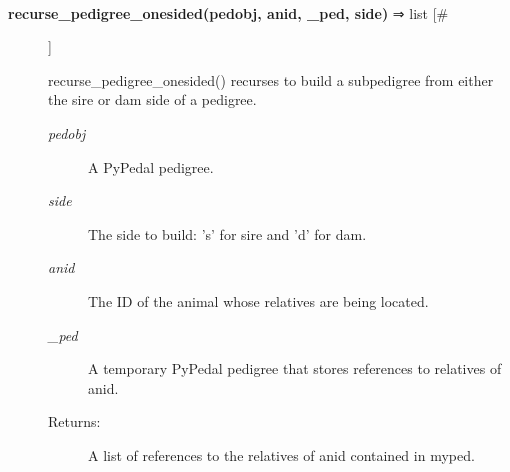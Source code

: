 \begin{description}
\begin{description}
\end{description}
\\ 

\item[\textbf{recurse\_pedigree\_onesided(pedobj, anid, \_ped, side)}
 ⇒ list [\#]]

 recurse\_pedigree\_onesided() recurses to build a subpedigree from either the sire or dam side of a pedigree.
\begin{description}
\item[\emph{pedobj}
] A PyPedal pedigree.
\item[\emph{side}
] The side to build: 's' for sire and 'd' for dam.
\item[\emph{anid}
] The ID of the animal whose relatives are being located.
\item[\emph{\_ped}
] A temporary PyPedal pedigree that stores references to relatives of anid.
\item[Returns:] A list of references to the relatives of anid contained in myped.

\end{description}
\\ 


\end{description}

